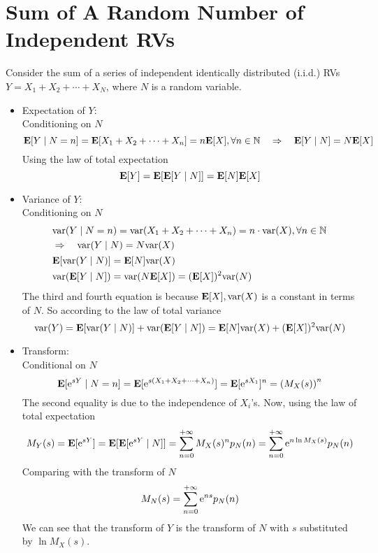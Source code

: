 \section{Sum of A Random Number of Independent RVs}
\label{sec:sum-of-a-random-number-of-independent-RVs}
Consider the sum of a series of independent identically distributed (i.i.d.) RVs $Y = X_1 + X_2 + \cdots + X_N$, where $N$ is a random variable. 
\begin{itemize}
    \item Expectation of $Y$: \\ 
    Conditioning on $N$
    \begin{equation}
        \mathbf{E}[Y \mid N = n] = \mathbf{E}[X_1 + X_2 + \cdots + X_n] = n \mathbf{E}[X], \forall n \in \mathbb{N} \quad\Rightarrow\quad \mathbf{E}[Y \mid N] = N \mathbf{E}[X]
    \end{equation}
    Using the law of total expectation
    \begin{equation}
        \mathbf{E}[Y] = \mathbf{E}[\mathbf{E}[Y \mid N]] = \mathbf{E}[N] \mathbf{E}[X]
    \end{equation}
    \item Variance of $Y$: \\
    Conditioning on $N$
    \begin{align}
        &\begin{aligned}
            &\mathrm{var}(Y \mid N = n) = \mathrm{var}(X_1 + X_2 + \cdots + X_n) = n \cdot \mathrm{var}(X), \forall n \in \mathbb{N} \\ 
            &\Rightarrow\quad \mathrm{var}(Y \mid N) = N \mathrm{var}(X) 
        \end{aligned} \\
        &\mathbf{E}[\mathrm{var}(Y \mid N)] = \mathbf{E}[N] \mathrm{var}(X) \\ 
        &\mathrm{var}(\mathbf{E}[Y \mid N]) = \mathrm{var}(N \mathbf{E}[X]) = (\mathbf{E}[X])^2 \mathrm{var}(N) 
    \end{align}
    The third and fourth equation is because $\mathbf{E}[X], \mathrm{var}(X)$ is a constant in terms of $N$. So according to the law of total variance
    \begin{equation}
        \mathrm{var}(Y) = \mathbf{E}[\mathrm{var}(Y \mid N)] + \mathrm{var}(\mathbf{E}[Y \mid N]) = \mathbf{E}[N] \mathrm{var}(X) + (\mathbf{E}[X])^2 \mathrm{var}(N)
    \end{equation}
    \item Transform: \\ 
    Conditional on $N$
    \begin{equation}
        \mathbf{E}[\mathrm{e}^{sY} \mid N = n] = \mathbf{E}[\mathrm{e}^{s(X_1 + X_2 + \cdots + X_n)}] = \mathbf{E}[\mathrm{e}^{sX_1}]^n = \qty(M_{X}(s))^n
    \end{equation}
    The second equality is due to the independence of $X_i$'s. Now, using the law of total expectation
    \begin{equation}
        M_{Y}(s) = \mathbf{E}[\mathrm{e}^{sY}] = \mathbf{E}[\mathbf{E}[\mathrm{e}^{sY} \mid N]] = \sum_{n=0}^{+\infty} M_{X}(s)^n p_N(n) = \sum_{n=0}^{+\infty} \mathrm{e}^{n \ln M_{X}(s)} p_{N}(n)
    \end{equation}
    Comparing with the transform of $N$
    \begin{equation}
        M_{N}(s) = \sum_{n=0}^{+\infty} \mathrm{e}^{ns} p_{N}(n)
    \end{equation}
    We can see that the transform of $Y$ is the transform of $N$ with $s$ substituted by $\ln M_{X}(s)$.
 \end{itemize}
